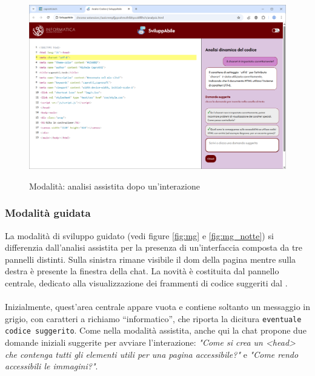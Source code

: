 \begin{figure}[H]
    \centering
    \includegraphics[width=1\linewidth, alt={Modalità di analisi assistita, dopo la prima interazione}]{img/analisi_ass2.png}
    \caption{Modalità: analisi assistita dopo un'interazione}\label{fig:aass2}
\end{figure}

\subsubsection{Modalità guidata}
\noindent La modalità di sviluppo guidato (vedi figure \ref{fig:mg} e \ref{fig:mg_notte}) si differenzia dall’analisi assistita per la presenza di un’interfaccia composta da tre pannelli distinti. Sulla sinistra rimane visibile il \acrshort{dom} della pagina mentre sulla destra è presente la finestra della chat. La novità è costituita dal pannello centrale, dedicato alla visualizzazione dei frammenti di codice suggeriti dal .\\
\\
Inizialmente, quest’area centrale appare vuota e contiene soltanto un messaggio in grigio, con caratteri a richiamo “informatico”, che riporta la dicitura \texttt{eventuale codice suggerito}. Come nella modalità assistita, anche qui la chat propone due domande iniziali suggerite per avviare l’interazione: \textit{"Come si crea un <head> che contenga tutti gli elementi utili per una pagina accessibile?"} e \textit{"Come rendo accessibili le immagini?"}.\\

